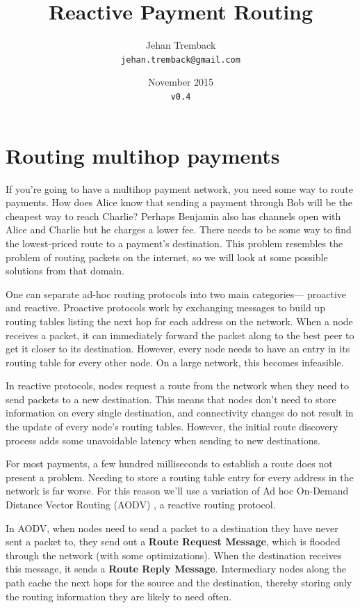 \documentclass[a4paper]{article}
\title{Reactive Payment Routing}
\author{Jehan Tremback\\
\texttt{jehan.tremback@gmail.com}\\}
\date{November 2015\\
\texttt{v0.4}}
\begin{document}
\maketitle

\begin{abstract}
\end{abstract}

\section{Routing multihop payments}

If you're going to have a multihop payment network, you need some way to route payments. How does Alice know that sending a payment through Bob will be the cheapest way to reach Charlie? Perhaps Benjamin also has channels open with Alice and Charlie but he charges a lower fee. There needs to be some way to find the lowest-priced route to a payment's destination. This problem resembles the problem of routing packets on the internet, so we will look at some possible solutions from that domain.

One can separate ad-hoc routing protocols into two main categories--- proactive and reactive. Proactive protocols work by exchanging messages to build up routing tables listing the next hop for each address on the network. When a node receives a packet, it can immediately forward the packet along to the best peer to get it closer to its destination. However, every node needs to have an entry in its routing table for every other node. On a large network, this becomes infeasible.

In reactive protocols, nodes request a route from the network when they need to send packets to a new destination. This means that nodes don't need to store information on every single destination, and connectivity changes do not result in the update of every node's routing tables. However, the initial route discovery process adds some unavoidable latency when sending to new destinations.

For most payments, a few hundred milliseconds to establish a route does not present a problem. Needing to store a routing table entry for every address in the network is far worse. For this reason we'll use a variation of Ad hoc On-Demand Distance Vector Routing (AODV) \cite{aodv}, a reactive routing protocol.

In AODV, when nodes need to send a packet to a destination they have never sent a packet to, they send out a \textbf{Route Request Message}, which is flooded through the network (with some optimizations). When the destination receives this message, it sends a \textbf{Route Reply Message}. Intermediary nodes along the path cache the next hops for the source and the destination, thereby storing only the routing information they are likely to need often.
\end{document}
